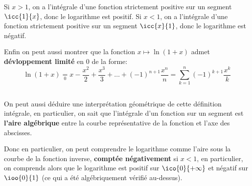 \documentclass{report}
\begin{document}
   Si \(x > 1\), on a l'intégrale d'une fonction strictement positive sur un segment \(\icc{1}{x}\), donc le logarithme est positif.\+
   Si \(x < 1\), on a l'intégrale d'une fonction strictement positive sur un segment \(\icc{x}{1}\), donc le logarithme est négatif.\<

   Enfin on peut aussi montrer que la fonction \(x \mapsto \ln(1 + x)\) admet \textbf{dévloppement limité} en \(0\) de la forme:
   \[
      \ln(1 + x) \underset{0}{=} x - \frac{x^2}{2} + \frac{x^3}{3} + \ldots +(-1)^{n+1} \frac{x^n}{n} = \sum_{k=1}^n (-1)^{k+1} \frac{x^k}{k}
   \] 

   \subsection*{}
   On peut aussi déduire une interprétation géométrique de cette définition intégrale, en particulier, on sait que l'intégrale d'un fonction sur un segment est \textbf{l'aire algébrique} entre la courbe représentative de la fonction et l'axe des abscisses.\<

   Donc en particulier, on peut comprendre le logarithme comme l'aire sous la courbe de la fonction inverse, \textbf{comptée négativement} si \(x < 1\), en particulier, on comprends alors que le logarithme est positif sur \(\ico{0}{+\infty}\) et négatif sur \(\ioo{0}{1}\) (ce qui a été algébriquement vérifié au-dessus).
\end{document}
